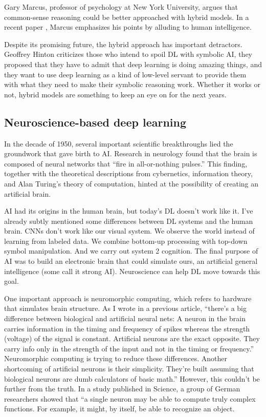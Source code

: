 \documentclass{article}
\begin{document}
Gary Marcus, professor of psychology at New York University, argues that common-sense reasoning could be better approached with hybrid models. In a recent paper \cite{40}, Marcus emphasizes his points by alluding to human intelligence.

Despite its promising future, the hybrid approach has important detractors. Geoffrey Hinton criticizes those who intend to spoil DL with symbolic AI, they proposed that they have to admit that deep learning is doing amazing things, and they want to use deep learning as a kind of low-level servant to provide them with what they need to make their symbolic reasoning work. Whether it works or not, hybrid models are something to keep an eye on for the next years.

\subsection{Neuroscience-based deep learning}
In the decade of 1950, several important scientific breakthroughs lied the groundwork that gave birth to AI. Research in neurology found that the brain is composed of neural networks that “fire in all-or-nothing pulses.” This finding, together with the theoretical descriptions from cybernetics, information theory, and Alan Turing’s theory of computation, hinted at the possibility of creating an artificial brain.

AI had its origins in the human brain, but today’s DL doesn’t work like it. I’ve already subtly mentioned some differences between DL systems and the human brain. CNNs don’t work like our visual system. We observe the world instead of learning from labeled data. We combine bottom-up processing with top-down symbol manipulation. And we carry out system 2 cognition. The final purpose of AI was to build an electronic brain that could simulate ours, an artificial general intelligence (some call it strong AI). Neuroscience can help DL move towards this goal.

One important approach is neuromorphic computing, which refers to hardware that simulates brain structure. As I wrote in a previous article, “there’s a big difference between biological and artificial neural nets: A neuron in the brain carries information in the timing and frequency of spikes whereas the strength (voltage) of the signal is constant. Artificial neurons are the exact opposite. They carry info only in the strength of the input and not in the timing or frequency.” Neuromorphic computing is trying to reduce these differences.
Another shortcoming of artificial neurons is their simplicity. They’re built assuming that biological neurons are dumb calculators of basic math.” However, this couldn’t be further from the truth. In a study \cite{37} published in Science, a group of German researchers showed that “a single neuron may be able to compute truly complex functions. For example, it might, by itself, be able to recognize an object.
\end{document}

